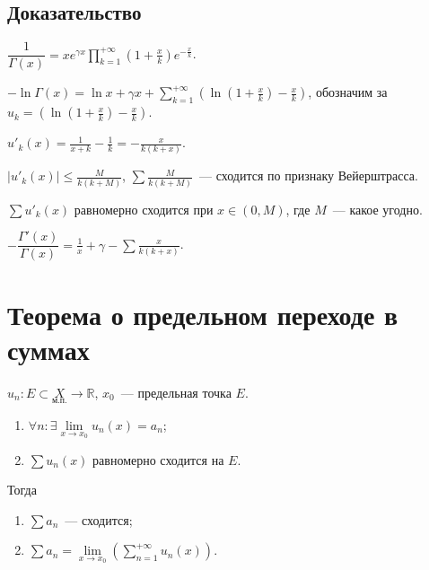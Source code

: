 \documentclass{article}
\begin{document}
        \subsection{Доказательство}
        
            $\dfrac{1}{\Gamma(x)} = x e^{\gamma x} \prod\limits^{+\infty}_{k = 1} \left( 1 + \frac{x}{k} \right) e^{-\frac{x}{k}}$.
            
            $-\ln \Gamma(x) = \ln x + \gamma x + \sum\limits^{+\infty}_{k = 1} \left( \ln \left( 1 + \frac{x}{k} \right) - \frac{x}{k} \right)$, обозначим за $u_k = \left( \ln \left( 1 + \frac{x}{k} \right) - \frac{x}{k} \right)$.
            
            $u'_k(x) = \frac{1}{x + k} - \frac{1}{k} = -\frac{x}{k(k + x)}$.
            
            $| u'_k(x) | \leqslant \frac{M}{k (k + M)}$, $\sum \frac{M}{k (k + M)}$~--- сходится по признаку Вейерштрасса.
            
            $\sum u'_k(x)$ равномерно сходится при $x \in (0, M)$, где $M$~--- какое угодно.
            
            $- \dfrac{\Gamma'(x)}{\Gamma(x)} = \frac{1}{x} + \gamma - \sum \frac{x}{k(k + x)}$.
            
    \newpage
    
    \section{Теорема о предельном переходе в суммах}
    
        $u_n : E \subset \underset{\text{м.п.}}{X} \rightarrow \mathbb{R}$, $x_0$~--- предельная точка $E$.
        
        \begin{enumerate}
        
            \item $\forall n : \exists \lim\limits_{x \rightarrow x_0} u_n(x) = a_n$;
            
            \item $\sum u_n(x)$ равномерно сходится на $E$.
        
        \end{enumerate}
        
        Тогда
        
        \begin{enumerate}
        
            \item $\sum a_n$~--- сходится;
            
            \item $\sum a_n = \lim\limits_{x \rightarrow x_0} \left( \sum\limits^{+\infty}_{n = 1} u_n(x) \right)$.
            
        \end{enumerate}
        
\end{document}
